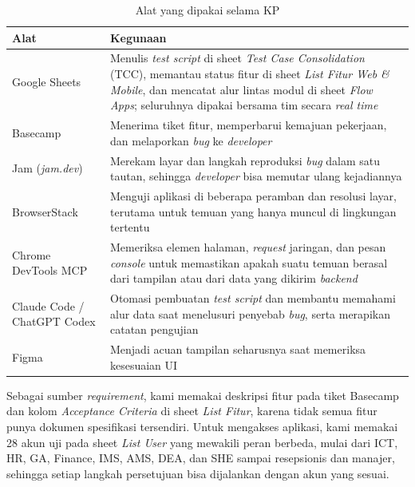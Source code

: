 \begin{table}[H]
\caption{Alat yang dipakai selama KP}
\label{tab:alat-kerja}
\centering
\begin{tabularx}{\textwidth}{|p{3.6cm}|X|}
\hline
\textbf{Alat} & \textbf{Kegunaan} \\
\hline
Google Sheets & Menulis \textit{test script} di sheet \textit{Test Case Consolidation} (TCC), memantau status fitur di sheet \textit{List Fitur Web \& Mobile}, dan mencatat alur lintas modul di sheet \textit{Flow Apps}; seluruhnya dipakai bersama tim secara \textit{real time} \\
\hline
Basecamp & Menerima tiket fitur, memperbarui kemajuan pekerjaan, dan melaporkan \textit{bug} ke \textit{developer} \\
\hline
Jam (\textit{jam.dev}) & Merekam layar dan langkah reproduksi \textit{bug} dalam satu tautan, sehingga \textit{developer} bisa memutar ulang kejadiannya \\
\hline
BrowserStack & Menguji aplikasi di beberapa peramban dan resolusi layar, terutama untuk temuan yang hanya muncul di lingkungan tertentu \\
\hline
Chrome DevTools MCP & Memeriksa elemen halaman, \textit{request} jaringan, dan pesan \textit{console} untuk memastikan apakah suatu temuan berasal dari tampilan atau dari data yang dikirim \textit{backend} \\
\hline
Claude Code / ChatGPT Codex & Otomasi pembuatan \textit{test script} dan membantu memahami alur data saat menelusuri penyebab \textit{bug}, serta merapikan catatan pengujian \\
\hline
Figma & Menjadi acuan tampilan seharusnya saat memeriksa kesesuaian UI \\
\hline
\end{tabularx}
\end{table}

Sebagai sumber \textit{requirement}, kami memakai deskripsi fitur pada tiket Basecamp dan kolom \textit{Acceptance Criteria} di sheet \textit{List Fitur}, karena tidak semua fitur punya dokumen spesifikasi tersendiri. Untuk mengakses aplikasi, kami memakai 28 akun uji pada sheet \textit{List User} yang mewakili peran berbeda, mulai dari ICT, HR, GA, Finance, IMS, AMS, DEA, dan SHE sampai resepsionis dan manajer, sehingga setiap langkah persetujuan bisa dijalankan dengan akun yang sesuai.

